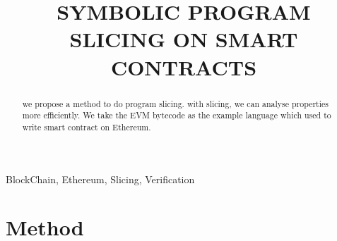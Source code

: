 \documentclass{article}
\title{SYMBOLIC PROGRAM SLICING ON SMART CONTRACTS}
\begin{document}
%

\maketitle

%

\begin{abstract}

    we propose a method to do program slicing. with slicing, we can analyse properties more efficiently. We take the EVM bytecode as the example language which used to write smart contract\cite{szabo2003advances} on Ethereum.

\end{abstract}

\begin{keywords}
BlockChain, Ethereum, Slicing, Verification
\end{keywords}

\section{Method}
\label{sec:method}
\end{document}

